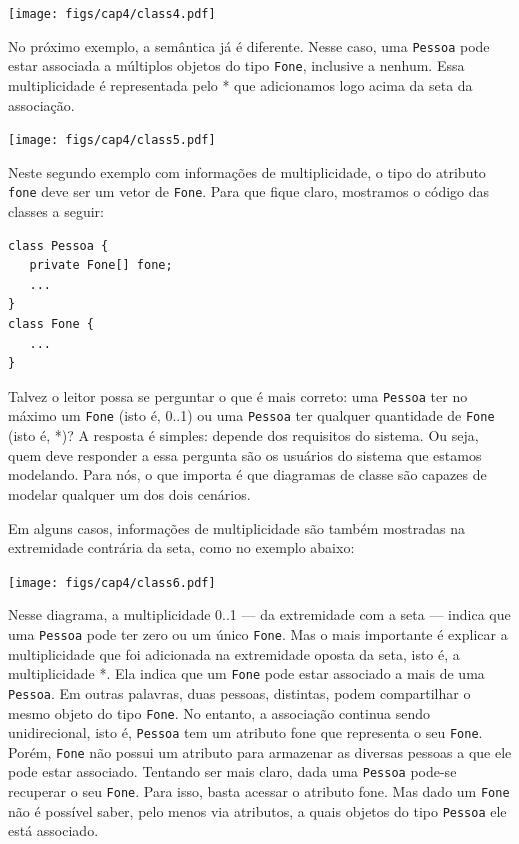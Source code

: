 \documentclass[
  11pt,
  twoside]{book}
\newcommand{\passthrough}[1]{#1}
\begin{document}
\texttt{[image: figs/cap4/class4.pdf]}

No próximo exemplo, a semântica já é diferente. Nesse caso, uma
\passthrough{\lstinline!Pessoa!} pode estar associada a múltiplos
objetos do tipo \passthrough{\lstinline!Fone!}, inclusive a nenhum. Essa
multiplicidade é representada pelo * que adicionamos logo acima da seta
da associação.

\texttt{[image: figs/cap4/class5.pdf]}

Neste segundo exemplo com informações de multiplicidade, o tipo do
atributo \passthrough{\lstinline!fone!} deve ser um vetor de
\passthrough{\lstinline!Fone!}. Para que fique claro, mostramos o código
das classes a seguir:

\begin{lstlisting}
class Pessoa {
   private Fone[] fone;
   ...
}
class Fone {
   ...
}
\end{lstlisting}

Talvez o leitor possa se perguntar o que é mais correto: uma
\passthrough{\lstinline!Pessoa!} ter no máximo um
\passthrough{\lstinline!Fone!} (isto é, 0..1) ou uma
\passthrough{\lstinline!Pessoa!} ter qualquer quantidade de
\passthrough{\lstinline!Fone!} (isto é, *)? A resposta é simples:
depende dos requisitos do sistema. Ou seja, quem deve responder a essa
pergunta são os usuários do sistema que estamos modelando. Para nós, o
que importa é que diagramas de classe são capazes de modelar qualquer um
dos dois cenários.

Em alguns casos, informações de multiplicidade são também mostradas na
extremidade contrária da seta, como no exemplo abaixo:

\texttt{[image: figs/cap4/class6.pdf]}

Nesse diagrama, a multiplicidade 0..1 --- da extremidade com a seta ---
indica que uma \passthrough{\lstinline!Pessoa!} pode ter zero ou um
único \passthrough{\lstinline!Fone!}. Mas o mais importante é explicar a
multiplicidade que foi adicionada na extremidade oposta da seta, isto é,
a multiplicidade *. Ela indica que um \passthrough{\lstinline!Fone!}
pode estar associado a mais de uma \passthrough{\lstinline!Pessoa!}. Em
outras palavras, duas pessoas, distintas, podem compartilhar o mesmo
objeto do tipo \passthrough{\lstinline!Fone!}. No entanto, a associação
continua sendo unidirecional, isto é, \passthrough{\lstinline!Pessoa!}
tem um atributo fone que representa o seu
\passthrough{\lstinline!Fone!}. Porém, \passthrough{\lstinline!Fone!}
não possui um atributo para armazenar as diversas pessoas a que ele pode
estar associado. Tentando ser mais claro, dada uma
\passthrough{\lstinline!Pessoa!} pode-se recuperar o seu
\passthrough{\lstinline!Fone!}. Para isso, basta acessar o atributo
fone. Mas dado um \passthrough{\lstinline!Fone!} não é possível saber,
pelo menos via atributos, a quais objetos do tipo
\passthrough{\lstinline!Pessoa!} ele está associado.
\end{document}
